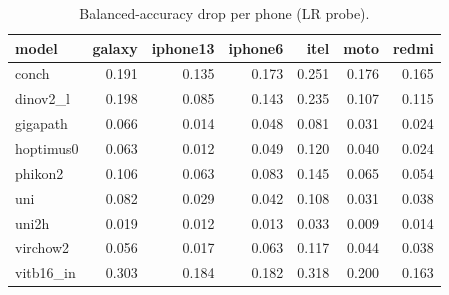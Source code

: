 \begin{table}[t]
\centering
\small
\begin{tabular}{lrrrrrr}
\toprule
model & galaxy & iphone13 & iphone6 & itel & moto & redmi \\
\midrule
conch & 0.191 & 0.135 & 0.173 & 0.251 & 0.176 & 0.165 \\
dinov2\_l & 0.198 & 0.085 & 0.143 & 0.235 & 0.107 & 0.115 \\
gigapath & 0.066 & 0.014 & 0.048 & 0.081 & 0.031 & 0.024 \\
hoptimus0 & 0.063 & 0.012 & 0.049 & 0.120 & 0.040 & 0.024 \\
phikon2 & 0.106 & 0.063 & 0.083 & 0.145 & 0.065 & 0.054 \\
uni & 0.082 & 0.029 & 0.042 & 0.108 & 0.031 & 0.038 \\
uni2h & 0.019 & 0.012 & 0.013 & 0.033 & 0.009 & 0.014 \\
virchow2 & 0.056 & 0.017 & 0.063 & 0.117 & 0.044 & 0.038 \\
vitb16\_in & 0.303 & 0.184 & 0.182 & 0.318 & 0.200 & 0.163 \\
\bottomrule
\end{tabular}
\caption{Balanced-accuracy drop per phone (LR probe).}
\label{tab:perphone}
\end{table}
